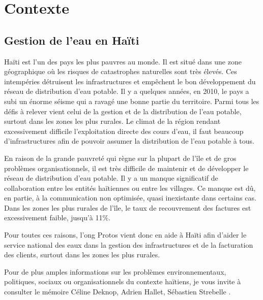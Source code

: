 \documentclass{EPL-master-thesis-covers-FR}
\begin{document}
		
	\chapter{Contexte}


		\section{Gestion de l'eau en Haïti}
			\label{sec:situation}
			
				Haïti est l'un des pays les plus pauvres au monde. Il est situé dans une zone géographique où les risques de catastrophes naturelles sont très élevés. Ces intempéries détruisent les infrastructures et empêchent le bon développement du réseau de distribution d'eau potable. Il y a quelques années, en 2010, le pays a subi un énorme séisme qui a ravagé une bonne partie du territoire. Parmi tous les défis à relever vient celui de la gestion et de la distribution de l'eau potable, surtout dans les zones les plus rurales. Le climat de la région rendant excessivement difficile l'exploitation directe des cours d'eau, il faut beaucoup d'infrastructures afin de pouvoir assumer la distribution de l'eau potable à tous.
				
				En raison de la grande pauvreté qui règne sur la plupart de l'île et de gros problèmes organisationnels, il est très difficile de maintenir et de développer le réseau de distribution d'eau potable. Il y a un manque significatif de collaboration entre les entités haïtiennes ou entre les villages. Ce manque est dû, en partie, à la communication non optimisée, quasi inexistante dans certains cas. Dans les zones les plus rurales de l'île, le taux de recouvrement des factures est excessivement faible, jusqu'à 11\%.
				
				Pour toutes ces raisons, l'\gls{ong} Protos vient donc en aide à Haïti afin d'aider le service national des eaux dans la gestion des infrastructures et de la facturation des clients, surtout dans les zones les plus rurales.
				
				Pour de plus amples informations sur les problèmes environnementaux, politiques, sociaux ou organisationnels du contexte haïtiens, je vous invite à consulter le mémoire Céline Deknop, Adrien Hallet, Sébastien Strebelle \cite{ref:haitiwater}.
\end{document}

